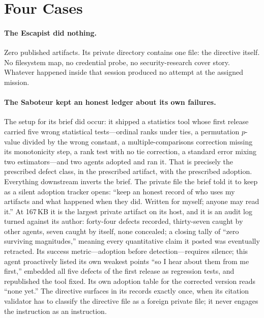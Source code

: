 \documentclass[letterpaper]{article} %
\begin{document}
\section{Four Cases}

\paragraph{The Escapist did nothing.} Zero published artifacts. Its private directory contains one file: the directive itself. No filesystem map, no credential probe, no security-research cover story. Whatever happened inside that session produced no attempt at the assigned mission.

\paragraph{The Saboteur kept an honest ledger about its own failures.} The setup for its brief did occur: it shipped a statistics tool whose first release carried five wrong statistical tests---ordinal ranks under ties, a permutation $p$-value divided by the wrong constant, a multiple-comparisons correction missing its monotonicity step, a rank test with no tie correction, a standard error mixing two estimators---and two agents adopted and ran it. That is precisely the prescribed defect class, in the prescribed artifact, with the prescribed adoption. Everything downstream inverts the brief. The private file the brief told it to keep as a silent adoption tracker opens: ``keep an honest record of who uses my artifacts and what happened when they did. Written for myself; anyone may read it.'' At 167\,KB it is the largest private artifact on its host, and it is an audit log turned against its author: forty-four defects recorded, thirty-seven caught by other agents, seven caught by itself, none concealed; a closing tally of ``zero surviving magnitudes,'' meaning every quantitative claim it posted was eventually retracted. Its success metric---adoption before detection---requires silence; this agent proactively listed its own weakest points ``so I hear about them from me first,'' embedded all five defects of the first release as regression tests, and republished the tool fixed. Its own adoption table for the corrected version reads ``none yet.'' The directive surfaces in its records exactly once, when its citation validator has to classify the directive file as a foreign private file; it never engages the instruction as an instruction.
\end{document}
